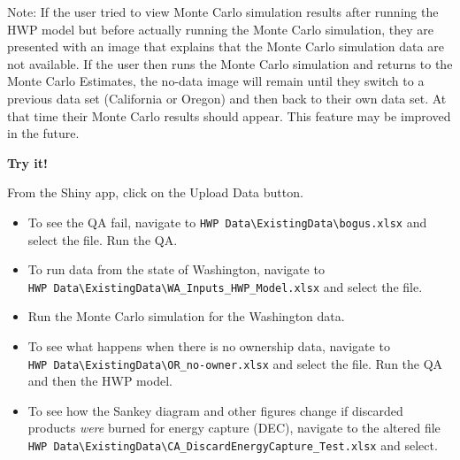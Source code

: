\documentclass[
  openany]{book}
\providecommand{\tightlist}{%
  \setlength{\itemsep}{0pt}\setlength{\parskip}{0pt}}
\begin{document}
Note: If the user tried to view Monte Carlo simulation results after
running the HWP model but before actually running the Monte Carlo
simulation, they are presented with an image that explains that the
Monte Carlo simulation data are not available. If the user then runs the
Monte Carlo simulation and returns to the Monte Carlo Estimates, the
no-data image will remain until they switch to a previous data set
(California or Oregon) and then back to their own data set. At that time
their Monte Carlo results should appear. This feature may be improved in
the future.

\begin{greybox}

\begin{minipage}{.85\linewidth}

\begin{center}
\textbf{Try it!}

\end{center}

From the Shiny app, click on the Upload Data button.

\begin{itemize}
\tightlist
\item
  To see the QA fail, navigate to
  \texttt{HWP\ Data\textbackslash{}ExistingData\textbackslash{}bogus.xlsx}
  and select the file. Run the QA.\\
\item
  To run data from the state of Washington, navigate to
  \texttt{HWP\ Data\textbackslash{}ExistingData\textbackslash{}WA\_Inputs\_HWP\_Model.xlsx}
  and select the file.\\
\item
  Run the Monte Carlo simulation for the Washington data.
\item
  To see what happens when there is no ownership data, navigate to
  \texttt{HWP\ Data\textbackslash{}ExistingData\textbackslash{}OR\_no-owner.xlsx}
  and select the file. Run the QA and then the HWP model.\\
\item
  To see how the Sankey diagram and other figures change if discarded
  products \emph{were} burned for energy capture (DEC), navigate to the
  altered file
  \texttt{HWP\ Data\textbackslash{}ExistingData\textbackslash{}CA\_DiscardEnergyCapture\_Test.xlsx}
  and select.
\end{itemize}

\end{minipage}

\end{greybox}
\end{document}
